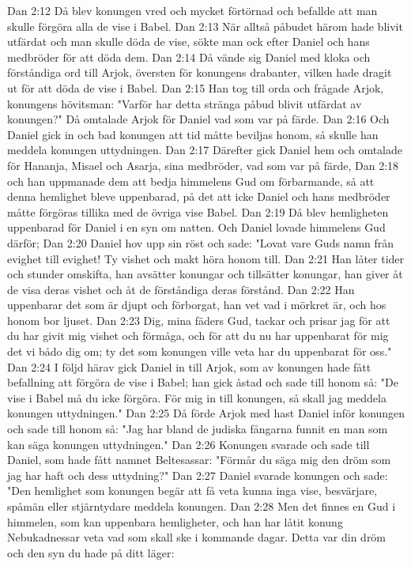 Dan 2:12  Då blev konungen vred och mycket förtörnad och befallde att man skulle förgöra alla de vise i Babel.
Dan 2:13  När alltså påbudet härom hade blivit utfärdat och man skulle döda de vise, sökte man ock efter Daniel och hans medbröder för att döda dem.
Dan 2:14  Då vände sig Daniel med kloka och förståndiga ord till Arjok, översten för konungens drabanter, vilken hade dragit ut för att döda de vise i Babel.
Dan 2:15  Han tog till orda och frågade Arjok, konungens hövitsman: "Varför har detta stränga påbud blivit utfärdat av konungen?" Då omtalade Arjok för Daniel vad som var på färde.
Dan 2:16  Och Daniel gick in och bad konungen att tid måtte beviljas honom, så skulle han meddela konungen uttydningen.
Dan 2:17  Därefter gick Daniel hem och omtalade för Hananja, Misael och Asarja, sina medbröder, vad som var på färde,
Dan 2:18  och han uppmanade dem att bedja himmelens Gud om förbarmande, så att denna hemlighet bleve uppenbarad, på det att icke Daniel och hans medbröder måtte förgöras tillika med de övriga vise Babel.
Dan 2:19  Då blev hemligheten uppenbarad för Daniel i en syn om natten. Och Daniel lovade himmelens Gud därför;
Dan 2:20  Daniel hov upp sin röst och sade: "Lovat vare Guds namn från evighet till evighet! Ty vishet och makt höra honom till.
Dan 2:21  Han låter tider och stunder omskifta, han avsätter konungar och tillsätter konungar, han giver åt de visa deras vishet och åt de förståndiga deras förstånd.
Dan 2:22  Han uppenbarar det som är djupt och förborgat, han vet vad i mörkret är, och hos honom bor ljuset.
Dan 2:23  Dig, mina fäders Gud, tackar och prisar jag för att du har givit mig vishet och förmåga, och för att du nu har uppenbarat för mig det vi bådo dig om; ty det som konungen ville veta har du uppenbarat för oss."
Dan 2:24  I följd härav gick Daniel in till Arjok, som av konungen hade fått befallning att förgöra de vise i Babel; han gick åstad och sade till honom så: "De vise i Babel må du icke förgöra. För mig in till konungen, så skall jag meddela konungen uttydningen."
Dan 2:25  Då förde Arjok med hast Daniel inför konungen och sade till honom så: "Jag har bland de judiska fångarna funnit en man som kan säga konungen uttydningen."
Dan 2:26  Konungen svarade och sade till Daniel, som hade fått namnet Beltesassar: "Förmår du säga mig den dröm som jag har haft och dess uttydning?"
Dan 2:27  Daniel svarade konungen och sade: "Den hemlighet som konungen begär att få veta kunna inga vise, besvärjare, spåmän eller stjärntydare meddela konungen.
Dan 2:28  Men det finnes en Gud i himmelen, som kan uppenbara hemligheter, och han har låtit konung Nebukadnessar veta vad som skall ske i kommande dagar. Detta var din dröm och den syn du hade på ditt läger:
